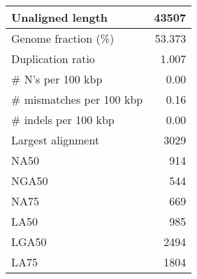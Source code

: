 \documentclass[12pt,a4paper]{article}
\begin{document}
\begin{table}[ht]
\begin{center}
\begin{tabular}{|l*{1}{|r}|}
Unaligned length & 43507 \\ \hline
Genome fraction (\%) & 53.373 \\ \hline
Duplication ratio & 1.007 \\ \hline
\# N's per 100 kbp & 0.00 \\ \hline
\# mismatches per 100 kbp & 0.16 \\ \hline
\# indels per 100 kbp & 0.00 \\ \hline
Largest alignment & 3029 \\ \hline
NA50 & 914 \\ \hline
NGA50 & 544 \\ \hline
NA75 & 669 \\ \hline
LA50 & 985 \\ \hline
LGA50 & 2494 \\ \hline
LA75 & 1804 \\ \hline
\end{tabular}
\end{center}
\end{table}
\end{document}
